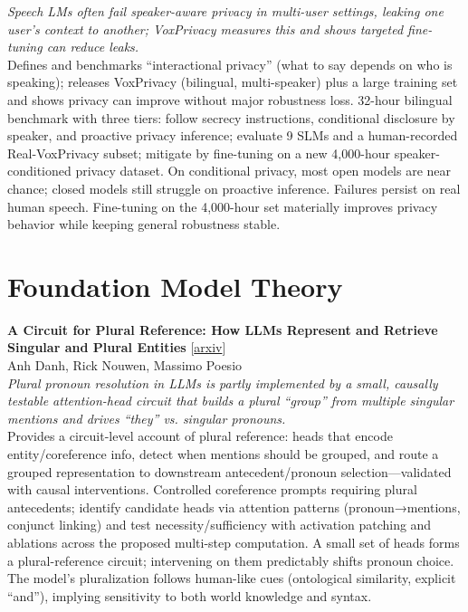 \documentclass[12pt,letterpaper]{article}
\begin{document}
{\small\textit{Speech LMs often fail speaker-aware privacy in multi-user settings, leaking one user's context to another; VoxPrivacy measures this and shows targeted fine-tuning can reduce leaks.}}\\[1pt]
{\footnotesize Defines and benchmarks ``interactional privacy'' (what to say depends on who is speaking); releases VoxPrivacy (bilingual, multi-speaker) plus a large training set and shows privacy can improve without major robustness loss. 32-hour bilingual benchmark with three tiers: follow secrecy instructions, conditional disclosure by speaker, and proactive privacy inference; evaluate 9 SLMs and a human-recorded Real-VoxPrivacy subset; mitigate by fine-tuning on a new 4,000-hour speaker-conditioned privacy dataset. On conditional privacy, most open models are near chance; closed models still struggle on proactive inference. Failures persist on real human speech. Fine-tuning on the 4,000-hour set materially improves privacy behavior while keeping general robustness stable.}

\medskip


\section*{Foundation Model Theory}

{\small\textbf{A Circuit for Plural Reference: How LLMs Represent and Retrieve Singular and Plural Entities}} {\scriptsize[\href{https://arxiv.org/abs/2609.03687}{arxiv}]}\\
{\scriptsize Anh Danh, Rick Nouwen, Massimo Poesio}\\

{\small\textit{Plural pronoun resolution in LLMs is partly implemented by a small, causally testable attention-head circuit that builds a plural ``group'' from multiple singular mentions and drives ``they'' vs. singular pronouns.}}\\[1pt]
{\footnotesize Provides a circuit-level account of plural reference: heads that encode entity/coreference info, detect when mentions should be grouped, and route a grouped representation to downstream antecedent/pronoun selection---validated with causal interventions. Controlled coreference prompts requiring plural antecedents; identify candidate heads via attention patterns (pronoun→mentions, conjunct linking) and test necessity/sufficiency with activation patching and ablations across the proposed multi-step computation. A small set of heads forms a plural-reference circuit; intervening on them predictably shifts pronoun choice. The model's pluralization follows human-like cues (ontological similarity, explicit ``and''), implying sensitivity to both world knowledge and syntax.}
\end{document}
